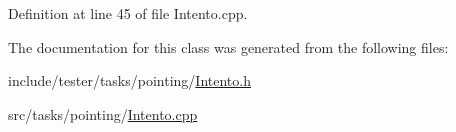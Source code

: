 Definition at line 45 of file Intento.cpp.



The documentation for this class was generated from the following files:\begin{DoxyCompactItemize}
\item 
include/tester/tasks/pointing/\hyperlink{_intento_8h}{Intento.h}\item 
src/tasks/pointing/\hyperlink{_intento_8cpp}{Intento.cpp}\end{DoxyCompactItemize}
